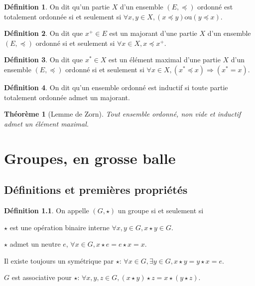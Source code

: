 \documentclass[a4paper, 11pt, french]{book}
\newenvironment{itemise}{\itemize}{\enditemize}
\theoremstyle{plain} %
\newtheorem{theoreme}{Théorème}
\theoremstyle{definition} %
\newtheorem{definition}{Définition}
\theoremstyle{remark} %
\newcommand{\1}{\mathds{1}}
\newcommand{\ou}{\mathrel{\mathrm{ou}}}
\begin{document}
\begin{definition}
	On dit qu'un partie $X$ d'un ensemble $(E, \preccurlyeq)$ ordonné est totalement ordonnée si et seulement si $\forall x, y\in X, (x\preccurlyeq y)\ou(y\preccurlyeq x)$.
\end{definition}


\begin{definition}
	On dit que $x^+\in E$ est un majorant d'une partie $X$ d'un ensemble $(E, \preccurlyeq)$ ordonné si et seulement si $\forall x\in X, x\preccurlyeq x^+$.
\end{definition}

\begin{definition}
	On dit que $x^*\in X$ est un élément maximal d'une partie $X$ d'un ensemble $(E, \preccurlyeq)$ ordonné si et seulement si $\forall x\in X, (x^*\preccurlyeq x)\Rightarrow(x^*=x)$.
\end{definition}


\begin{definition}
	On dit qu'un ensemble ordonné est inductif si toute partie totalement ordonnée admet un majorant.
\end{definition}

\begin{theoreme}[Lemme de Zorn]
	Tout ensemble ordonné, non vide et inductif admet un élément maximal.
\end{theoreme}

\chapter{Groupes, en grosse balle}

\section{Définitions et premières propriétés}

\begin{definition}
	On appelle $(G, \star)$ un groupe si et seulement si
	\begin{itemise}
		\item $\star$ est une opération binaire interne $\forall x, y\in G, x\star y\in G$.
		\item $\star$ admet un neutre $e$, $\forall x\in G, x\star e=e\star x=x$.
		\item Il existe toujours un symétrique par $\star$: $\forall x\in G, \exists y\in G, x\star y=y\star x=e$.
		\item $G$ est associative pour $\star$: $\forall x, y, z\in G, (x\star y)\star z=x\star(y\star z)$.
	\end{itemise}
\end{definition}
\end{document}
